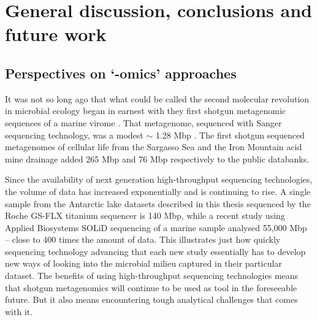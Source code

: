 \chapter{General discussion, conclusions and future work}
\label{ch:conc}
\acresetall

\section{Perspectives on `-omics' approaches }
It was not so long ago that what could be called the second molecular revolution in microbial ecology began in earnest with they first shotgun metagenomic sequences of a marine virome \cite{Breitbart2002}.
That metagenome, sequenced with Sanger sequencing technology, was a modest $\sim$ 1.28 Mbp \cite{Breitbart2002}.
The first shotgun sequenced metagenomes of cellular life from the Sargasso Sea \cite{Venter2004} and the Iron Mountain acid mine drainage \cite{Tyson2004} added 265 Mbp and 76 Mbp respectively to the public databanks.

Since the availability of next generation high-throughput sequencing technologies, the volume of data has increased exponentially and is continuing to rise.
A single sample from the Antarctic lake datasets described in this thesis sequenced by the Roche GS-FLX titanium sequencer is 140 Mbp, while a recent study using Applied Biosystems SOLiD sequencing of a marine sample \cite{Iverson2012} analysed 55,000 Mbp -- close to 400 times the amount of data.
This illustrates just how quickly sequencing technology advancing that each new study essentially has to develop new ways of looking into the microbial milieu captured in their particular dataset.
The benefits of using high-throughput sequencing technologies means that shotgun metagenomics will continue to be used as tool in the foreseeable future.
But it also means encountering tough analytical challenges that comes with it.

